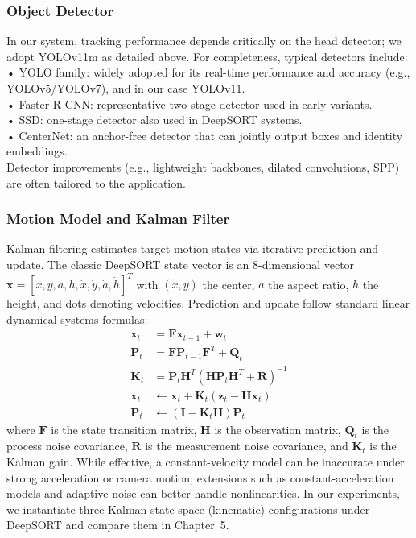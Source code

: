 \subsubsection{Object Detector}
In our system, tracking performance depends critically on the head detector; we adopt YOLOv11m as detailed above. For completeness, typical detectors include:\\
• YOLO family: widely adopted for its real-time performance and accuracy (e.g., YOLOv5/YOLOv7), and in our case YOLOv11.\\
• Faster R-CNN: representative two-stage detector used in early variants.\\
• SSD: one-stage detector also used in DeepSORT systems.\\
• CenterNet: an anchor-free detector that can jointly output boxes and identity embeddings.\\
Detector improvements (e.g., lightweight backbones, dilated convolutions, SPP) are often tailored to the application.

\subsubsection{Motion Model and Kalman Filter}
Kalman filtering estimates target motion states via iterative prediction and update. The classic DeepSORT state vector is an 8-dimensional vector $\mathbf{x} = [x, y, a, h, \dot{x}, \dot{y}, \dot{a}, \dot{h}]^T$ with $(x,y)$ the center, $a$ the aspect ratio, $h$ the height, and dots denoting velocities. Prediction and update follow standard linear dynamical systems formulas:
\begin{align*}
    \mathbf{x}_t &= \mathbf{F}\mathbf{x}_{t-1} + \mathbf{w}_t\\
    \mathbf{P}_t &= \mathbf{F}\mathbf{P}_{t-1}\mathbf{F}^T + \mathbf{Q}_t\\
    \mathbf{K}_t &= \mathbf{P}_t\mathbf{H}^T (\mathbf{H}\mathbf{P}_t\mathbf{H}^T + \mathbf{R})^{-1}\\
    \mathbf{x}_t &\leftarrow \mathbf{x}_t + \mathbf{K}_t (\mathbf{z}_t - \mathbf{H}\mathbf{x}_t)\\
    \mathbf{P}_t &\leftarrow (\mathbf{I} - \mathbf{K}_t\mathbf{H})\mathbf{P}_t
\end{align*}
where $\mathbf{F}$ is the state transition matrix, $\mathbf{H}$ is the observation matrix, $\mathbf{Q}_t$ is the process noise covariance, $\mathbf{R}$ is the measurement noise covariance, and $\mathbf{K}_t$ is the Kalman gain. While effective, a constant-velocity model can be inaccurate under strong acceleration or camera motion; extensions such as constant-acceleration models and adaptive noise can better handle nonlinearities. In our experiments, we instantiate three Kalman state-space (kinematic) configurations under DeepSORT and compare them in Chapter~5.

